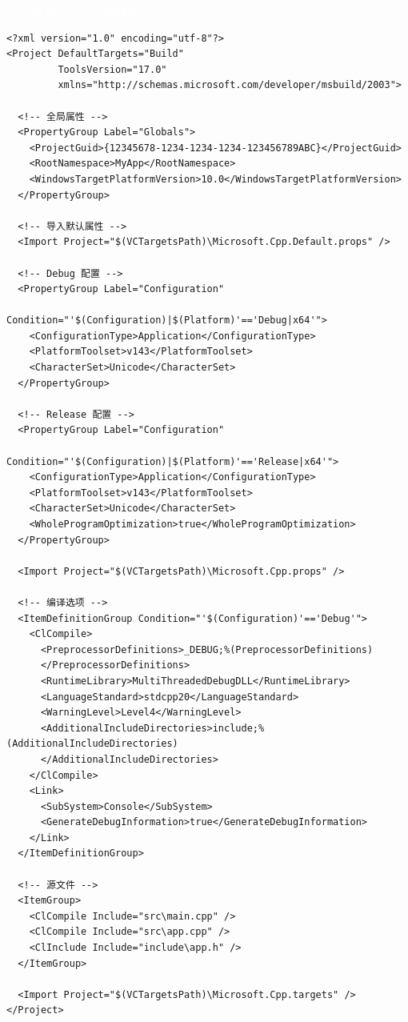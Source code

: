 \documentclass[12pt,a4paper,fontset=fandol]{ctexbook}
\newcommand{\vslabel}{%
  \noindent\begin{tcolorbox}[sharp corners,colback=vsheadbg,colframe=vsheadbg,
    left=6pt,right=6pt,top=2pt,bottom=2pt,boxrule=0pt]
  \textcolor{white}{\small\bfseries\sffamily Visual Studio / MSBuild}\end{tcolorbox}%
}
\begin{document}
\vslabel
\begin{lstlisting}[style=xmlstyle]
<?xml version="1.0" encoding="utf-8"?>
<Project DefaultTargets="Build"
         ToolsVersion="17.0"
         xmlns="http://schemas.microsoft.com/developer/msbuild/2003">

  <!-- 全局属性 -->
  <PropertyGroup Label="Globals">
    <ProjectGuid>{12345678-1234-1234-1234-123456789ABC}</ProjectGuid>
    <RootNamespace>MyApp</RootNamespace>
    <WindowsTargetPlatformVersion>10.0</WindowsTargetPlatformVersion>
  </PropertyGroup>

  <!-- 导入默认属性 -->
  <Import Project="$(VCTargetsPath)\Microsoft.Cpp.Default.props" />

  <!-- Debug 配置 -->
  <PropertyGroup Label="Configuration"
                 Condition="'$(Configuration)|$(Platform)'=='Debug|x64'">
    <ConfigurationType>Application</ConfigurationType>
    <PlatformToolset>v143</PlatformToolset>
    <CharacterSet>Unicode</CharacterSet>
  </PropertyGroup>

  <!-- Release 配置 -->
  <PropertyGroup Label="Configuration"
                 Condition="'$(Configuration)|$(Platform)'=='Release|x64'">
    <ConfigurationType>Application</ConfigurationType>
    <PlatformToolset>v143</PlatformToolset>
    <CharacterSet>Unicode</CharacterSet>
    <WholeProgramOptimization>true</WholeProgramOptimization>
  </PropertyGroup>

  <Import Project="$(VCTargetsPath)\Microsoft.Cpp.props" />

  <!-- 编译选项 -->
  <ItemDefinitionGroup Condition="'$(Configuration)'=='Debug'">
    <ClCompile>
      <PreprocessorDefinitions>_DEBUG;%(PreprocessorDefinitions)
      </PreprocessorDefinitions>
      <RuntimeLibrary>MultiThreadedDebugDLL</RuntimeLibrary>
      <LanguageStandard>stdcpp20</LanguageStandard>
      <WarningLevel>Level4</WarningLevel>
      <AdditionalIncludeDirectories>include;%(AdditionalIncludeDirectories)
      </AdditionalIncludeDirectories>
    </ClCompile>
    <Link>
      <SubSystem>Console</SubSystem>
      <GenerateDebugInformation>true</GenerateDebugInformation>
    </Link>
  </ItemDefinitionGroup>

  <!-- 源文件 -->
  <ItemGroup>
    <ClCompile Include="src\main.cpp" />
    <ClCompile Include="src\app.cpp" />
    <ClInclude Include="include\app.h" />
  </ItemGroup>

  <Import Project="$(VCTargetsPath)\Microsoft.Cpp.targets" />
</Project>
\end{lstlisting}
\end{document}
